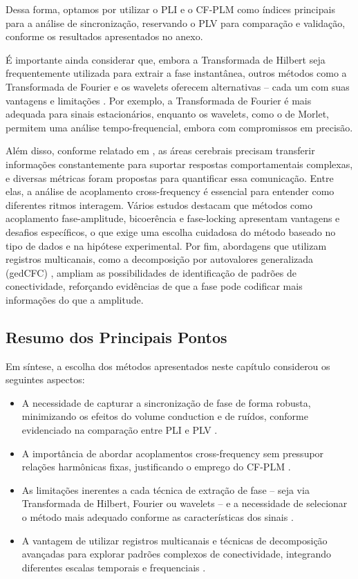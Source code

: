 Dessa forma, optamos por utilizar o PLI e o CF-PLM como índices principais para a análise de sincronização, reservando o PLV para comparação e validação, conforme os resultados apresentados no anexo.

É importante ainda considerar que, embora a Transformada de Hilbert seja frequentemente utilizada para extrair a fase instantânea, outros métodos como a Transformada de Fourier e os wavelets oferecem alternativas – cada um com suas vantagens e limitações \cite{seraj2018}. Por exemplo, a Transformada de Fourier é mais adequada para sinais estacionários, enquanto os wavelets, como o de Morlet, permitem uma análise tempo-frequencial, embora com compromissos em precisão.

Além disso, conforme relatado em \cite{sorrentino2022}, as áreas cerebrais precisam transferir informações constantemente para suportar respostas comportamentais complexas, e diversas métricas foram propostas para quantificar essa comunicação. Entre elas, a análise de acoplamento cross-frequency é essencial para entender como diferentes ritmos interagem. Vários estudos \cite{hulsemann2019} destacam que métodos como acoplamento fase-amplitude, bicoerência e fase-locking apresentam vantagens e desafios específicos, o que exige uma escolha cuidadosa do método baseado no tipo de dados e na hipótese experimental. Por fim, abordagens que utilizam registros multicanais, como a decomposição por autovalores generalizada (gedCFC) \cite{cohen2017}, ampliam as possibilidades de identificação de padrões de conectividade, reforçando evidências de que a fase pode codificar mais informações do que a amplitude.

\subsection{Resumo dos Principais Pontos}

Em síntese, a escolha dos métodos apresentados neste capítulo considerou os seguintes aspectos:

\begin{itemize}
  \item A necessidade de capturar a sincronização de fase de forma robusta, minimizando os efeitos do volume conduction e de ruídos, conforme evidenciado na comparação entre PLI e PLV \cite{seraj2018cerebral, zhang2014phase}.
  \item A importância de abordar acoplamentos cross-frequency sem pressupor relações harmônicas fixas, justificando o emprego do CF-PLM \cite{sorrentino2022detection, seraj2018cerebral, cohen2017multivariate}.
  \item As limitações inerentes a cada técnica de extração de fase – seja via Transformada de Hilbert, Fourier ou wavelets – e a necessidade de selecionar o método mais adequado conforme as características dos sinais \cite{seraj2018cerebral}.
  \item A vantagem de utilizar registros multicanais e técnicas de decomposição avançadas para explorar padrões complexos de conectividade, integrando diferentes escalas temporais e frequenciais \cite{cohen2017multivariate}.
\end{itemize}

